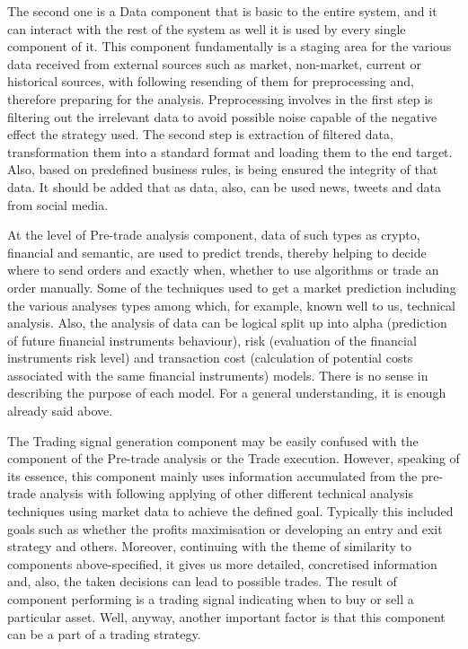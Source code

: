 \documentclass[thesis=B,english]{FITthesis}[2019/03/06]
\begin{document}
The second one is a Data component that is basic to the entire system, and it can interact with the rest of the system as well it is used by every single component of it. This component fundamentally is a staging area for the various data received from external sources such as market, non-market, current or historical sources, with following resending of them for pre­processing and, therefore preparing for the analysis. Pre­processing involves in the first step is filtering out the irrelevant data to avoid possible noise capable of the negative effect the strategy used. The second step is extraction of filtered data, transformation them into a standard format and loading them to the end target. Also, based on pre­defined business rules, is being ensured the integrity of that data. It should be added that as data, also, can be used news, tweets and data from social media.

At the level of Pre-trade analysis component, data of such types as crypto, financial and semantic, are used to predict trends, thereby helping to decide where to send orders and exactly when, whether to use algorithms or trade an order manually. Some of the techniques used to get a market prediction including the various analyses types among which, for example, known well to us, technical analysis. Also, the analysis of data can be logical split up into alpha (prediction of future financial instruments behaviour), risk (evaluation of the financial instruments risk level) and transaction cost (calculation of potential costs associated with the same financial instruments) models.  There is no sense in describing the purpose of each model. For a general understanding, it is enough already said above.

The Trading signal generation component may be easily confused with the component of the Pre-trade analysis or the Trade execution. However, speaking of its essence, this component mainly uses information accumulated from the pre-trade analysis with following applying of other different technical analysis techniques using market data to achieve the defined goal. Typically this included goals such as whether the profits maximisation or developing an entry and exit strategy and others. Moreover, continuing with the theme of similarity to components above-specified, it gives us more detailed, concretised information and, also, the taken decisions can lead to possible trades. The result of component performing is a trading signal indicating when to buy or sell a particular asset. Well, anyway, another important factor is that this component can be a part of a trading strategy.
\end{document}
